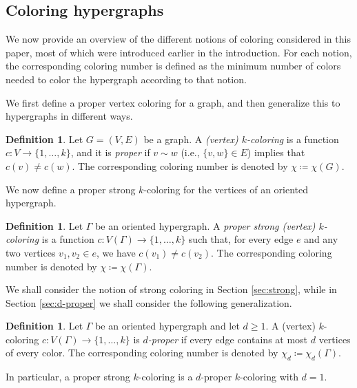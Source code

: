 \documentclass{article}
\theoremstyle{plain}
\theoremstyle{definition}
\newtheorem{definition}[theorem]{Definition}
\theoremstyle{remark}
\begin{document}
\subsection{Coloring hypergraphs}\label{section:overview-colorings}
We now provide an overview of the different notions of coloring considered in this paper, most of which were introduced earlier in the introduction. For each notion, the corresponding coloring number is defined as the minimum number of colors needed to color the hypergraph  according to that notion.

We first define a proper vertex coloring for a graph, and then generalize this to hypergraphs in different ways.
\begin{definition}
    Let $G=(V,E)$ be a graph. A \emph{(vertex) $k$-coloring} is a function $c:V\to \{1,\ldots,k\}$, and it is \emph{proper} if $v\sim w$ (i.e., $\{v,w\}\in E$) implies that $c(v)\neq c(w)$. The corresponding coloring number is denoted by $\chi\coloneqq \chi(G)$.
\end{definition}
We now define a proper strong $k$-coloring for the vertices of an oriented hypergraph.
\begin{definition}\label{def:coloring1}
    Let $\Gamma$ be an oriented hypergraph. A \emph{proper strong (vertex) $k$-coloring} is a function $c\colon V(\Gamma)\to \{1,\ldots,k\}$ such that, for every edge $e$ and any two vertices $v_1,v_2\in e$, we have $c(v_1)\neq c(v_2)$. The corresponding coloring number is denoted by $\chi\coloneqq \chi(\Gamma)$.
\end{definition}
We shall consider the notion of strong coloring in Section \ref{sec:strong}, while in Section \ref{sec:d-proper} we shall consider the following generalization.
\begin{definition}\label{def:d-proper1}
    Let $\Gamma$ be an oriented hypergraph and let $d\geq 1$. A (vertex) $k$-coloring $c\colon V(\Gamma)\to \{1,\ldots,k\}$ is \emph{$d$-proper} if every edge contains at most $d$ vertices of every color. The corresponding coloring number is denoted by $\chi_d\coloneqq \chi_d(\Gamma)$.
\end{definition}


In particular, a proper strong $k$-coloring is a $d$-proper $k$-coloring with $d=1$.\\
\end{document}
